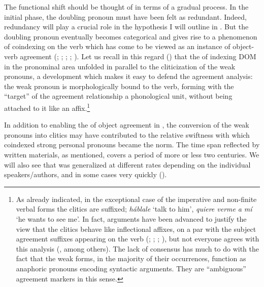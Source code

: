 \documentclass[output=paper]{LSP/langsci}
\begin{document}
 The functional shift should be thought of in terms of a gradual process. In the initial phase, the doubling pronoun must have been felt as redundant. Indeed, redundancy will play a crucial role in the hypothesis I will outline in . But the doubling pronoun eventually becomes categorical and gives rise to a phenomenon of coindexing on the verb which has come to be viewed as an instance of object-verb agreement (\citealt{Suner1988Agreement}; \citealt{Garcia-Miguel1991Duplicacion}; \citealt{Bogard1992Estatus}; \citealt{FernandezSoriano1999Pronombre}; \citealt{Franco2000Agreement}). Let us recall in this regard () that the  of indexing DOM in the pronominal area unfolded in parallel to the cliticization of the  weak pronouns, a development which makes it easy to defend the agreement analysis: the weak pronoun is morphologically bound to the verb, forming with the “target” \citep{Corbett1983Hierarchies} of the agreement relationship a phonological unit, without being attached to it like an affix.\footnote{As already indicated, in the exceptional case of the imperative and non-finite verbal forms the  clitics are suffixed; \cf \textit{hábla}\textit{le} ‘talk to him’, \textit{quiere ver}\textit{me} \textit{a mí} ‘he wants to see me’. In fact, arguments have been advanced to justify the view that the  clitics behave like inflectional affixes, on a par with the subject agreement suffixes appearing on the verb (\citealt{AlarcosLlorach1980Pronombres}; \citealt{Bogard1992Estatus}; \citealt{Fontana1993Phrase}; \citealt{Enrique-Arias2003Clitics}), but not everyone agrees with this analysis (\citealt{Olivaetal2013variacion}, among others). The lack of consensus has much to do with the fact that the weak forms, in the majority of their occurrences, function as anaphoric pronouns encoding syntactic arguments. They are “ambiguous” \citep[126]{Siewierska2004Person} agreement markers in this sense.} 

 In addition to enabling the  of object agreement in , the conversion of the weak pronouns into clitics may have contributed to the relative swiftness with which coindexed strong personal pronouns became the norm. The time span reflected by written materials, as mentioned, covers a period of more or less two centuries. We will also see that  was generalized at different rates depending on the individual speakers/authors, and in some cases very quickly ().
\end{document}
